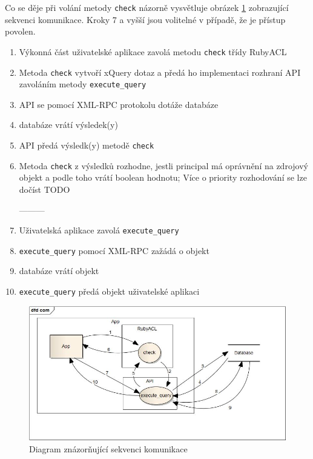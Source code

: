 Co se děje při volání metody \verb|check| názorně vysvětluje obrázek \ref{fig:Communication diagram} zobrazující sekvenci komunikace. Kroky 7 a vyšší jsou volitelné v případě, že je přístup povolen.
\begin{enumerate}
\item Výkonná část uživatelské aplikace zavolá metodu \verb|check| třídy RubyACL
\item Metoda \verb|check| vytvoří xQuery dotaz a předá ho implementaci rozhraní API zavoláním metody \verb|execute_query|
\item API se pomocí XML-RPC protokolu dotáže databáze
\item databáze vrátí výsledek(y)
\item API předá výsledk(y) metodě \verb|check|
\item Metoda \verb|check| z výsledků rozhodne, jestli principal má oprávnění na zdrojový objekt a podle toho vrátí boolean hodnotu; Více o priority rozhodování se lze dočíst TODO

---------

\item Uživatelská aplikace zavolá \verb|execute_query|
\item \verb|execute_query| pomocí XML-RPC zažádá o objekt
\item databáze vrátí objekt
\item \verb|execute_query| předá objekt uživatelské aplikaci
\end{enumerate}

\begin{figure}
\includegraphics[width=15cm]{com.jpg}
\caption{Diagram znázorňující sekvenci komunikace}
\label{fig:Communication diagram}
\end{figure}




